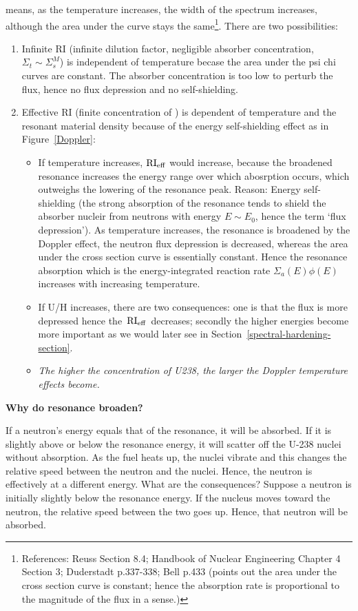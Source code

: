 \documentclass{school-22.211-notes}
\begin{document}
 means, as the temperature increases, the width of the spectrum increases, although the area under the curve stays the same\footnote{References: Reuss Section 8.4; Handbook of Nuclear Engineering Chapter 4 Section 3; Duderstadt p.337-338; Bell p.433 (points out the area under the cross section curve is constant; hence the absorption rate is proportional to the magnitude of the flux in a sense.)}. 
There are two possibilities: 
\begin{enumerate}
\item Infinite RI (infinite dilution factor, negligible absorber concentration, $\Sigma_t \sim \Sigma_s^M$) is independent of temperature becase the area under the psi chi curves are constant. The absorber concentration is too low to perturb the flux, hence no flux depression and no self-shielding.  
\item Effective RI (finite concentration of ) is dependent of temperature and the resonant material density because of the energy self-shielding effect as in Figure~\ref{Doppler}: 
  \begin{itemize}
  \item If temperature increases, $\mathrm{RI}_{\mathrm{eff}}$ would increase, because the broadened resonance increases the energy range over which abosrption occurs, which outweighs the lowering of the resonance peak. Reason: Energy self-shielding (the strong absorption of the resonance tends to shield the absorber nucleir from neutrons with energy $E\sim E_0$, hence the term `flux depression').  As temperature increases, the resonance is broadened by the Doppler effect, the neutron flux depression is decreased, whereas the area under the cross section curve is essentially constant. Hence the resonance absorption which is the energy-integrated reaction rate $\Sigma_a(E) \phi(E)$ increases with increasing temperature. 
  \item If U/H increases, there are two consequences: one is that the flux is more depressed hence the $\left. \mathrm{RI}_{\mathrm{eff}} \right.$ decreases; secondly the higher energies become more important as we would later see in Section~\ref{spectral-hardening-section}. 
  \item \textit{The higher the concentration of U238, the larger the Doppler temperature effects become.}
  \end{itemize}
\end{enumerate}


\textbf{Why do resonance broaden?} 

If a neutron's energy equals that of the resonance, it will be absorbed. If it is
slightly above or below the resonance energy, it will scatter off the U-238 nuclei
without absorption. As the fuel heats up, the nuclei vibrate and this changes the
relative speed between the neutron and the nuclei. Hence, the neutron is
effectively at a different energy. What are the consequences? Suppose a neutron
is initially slightly below the resonance energy. If the nucleus moves toward the
neutron, the relative speed between the two goes up. Hence, that neutron will be
absorbed.
\end{document}
